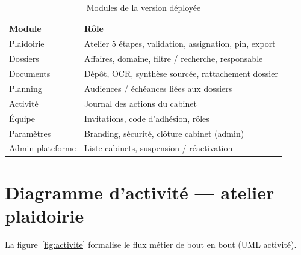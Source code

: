 \begin{table}[H]
\centering
\caption{Modules de la version déployée}
\label{tab:modules}
\small
\begin{tabular}{@{}lp{9.5cm}@{}}
\toprule
\textbf{Module} & \textbf{Rôle} \\
\midrule
Plaidoirie & Atelier 5 étapes, validation, assignation, pin, export \\
Dossiers & Affaires, domaine, filtre / recherche, responsable \\
Documents & Dépôt, OCR, synthèse sourcée, rattachement dossier \\
Planning & Audiences / échéances liées aux dossiers \\
Activité & Journal des actions du cabinet \\
Équipe & Invitations, code d'adhésion, rôles \\
Paramètres & Branding, sécurité, clôture cabinet (admin) \\
Admin plateforme & Liste cabinets, suspension / réactivation \\
\bottomrule
\end{tabular}
\end{table}

\section{Diagramme d'activité --- atelier plaidoirie}
\label{sec:activite}

La figure~\ref{fig:activite} formalise le flux métier de bout en bout (UML activité).

